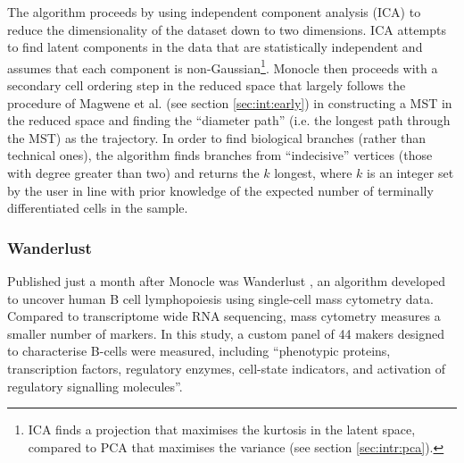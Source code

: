 The algorithm proceeds by using independent component analysis (ICA) to reduce the dimensionality of the dataset down to two dimensions. ICA attempts to find latent components in the data that are statistically independent and assumes that each component is non-Gaussian\footnote{
ICA finds a projection that maximises the kurtosis in the latent space, compared to PCA that maximises the variance (see section \ref{sec:intr:pca}).
}. 
 Monocle then proceeds with a secondary cell ordering step in the reduced space that largely follows the procedure of Magwene et al. \cite{Magwene2003-bm} (see section \ref{sec:int:early}) in constructing a MST in the reduced space and finding the ``diameter path'' (i.e. the longest path through the MST) as the trajectory. In order to find biological branches (rather than technical ones), the algorithm finds branches from ``indecisive'' vertices (those with degree greater than two) and returns the $k$ longest, where $k$ is an integer set by the user in line with prior knowledge of the expected number of terminally differentiated cells in the sample.

\subsubsection{Wanderlust}

Published just a month after Monocle was Wanderlust \cite{Bendall2014-rc}, an algorithm developed to uncover human B cell lymphopoiesis using single-cell mass cytometry data. Compared to transcriptome wide RNA sequencing, mass cytometry measures a smaller number of markers. In this study, a custom panel of 44 makers designed to characterise B-cells were measured, including ``phenotypic proteins, transcription factors, regulatory enzymes, cell-state indicators, and activation of regulatory signalling molecules''.

